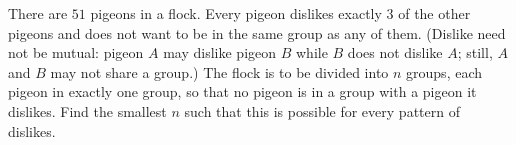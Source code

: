 There are $51$ pigeons in a flock. Every pigeon dislikes exactly $3$ of the other pigeons and does not want to be in the same group as any of them. (Dislike need not be mutual: pigeon $A$ may dislike pigeon $B$ while $B$ does not dislike $A$; still, $A$ and $B$ may not share a group.) The flock is to be divided into $n$ groups, each pigeon in exactly one group, so that no pigeon is in a group with a pigeon it dislikes. Find the smallest $n$ such that this is possible for every pattern of dislikes.
